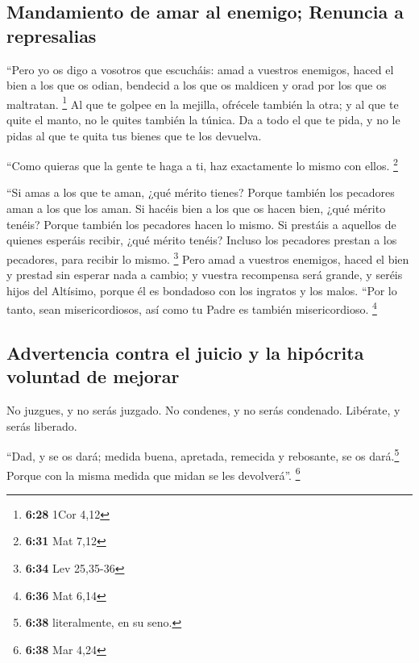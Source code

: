 \begin{paracol}{2}
\hypertarget{mandamiento-de-amar-al-enemigo-renuncia-a-represalias}{%
\subsection{Mandamiento de amar al enemigo; Renuncia a
represalias}\label{mandamiento-de-amar-al-enemigo-renuncia-a-represalias}}

 ``Pero yo os digo a vosotros que escucháis: amad a
vuestros enemigos, haced el bien a los que os odian, 
bendecid a los que os maldicen y orad por los que os maltratan.
\footnote{\textbf{6:28} 1Cor 4,12}  Al que te golpee en
la mejilla, ofrécele también la otra; y al que te quite el manto, no le
quites también la túnica.  Da a todo el que te pida, y no
le pidas al que te quita tus bienes que te los devuelva.

 ``Como quieras que la gente te haga a ti, haz
exactamente lo mismo con ellos. \footnote{\textbf{6:31} Mat 7,12}

 ``Si amas a los que te aman, ¿qué mérito tienes? Porque
también los pecadores aman a los que los aman.  Si hacéis
bien a los que os hacen bien, ¿qué mérito tenéis? Porque también los
pecadores hacen lo mismo.  Si prestáis a aquellos de
quienes esperáis recibir, ¿qué mérito tenéis? Incluso los pecadores
prestan a los pecadores, para recibir lo mismo. \footnote{\textbf{6:34}
  Lev 25,35-36}  Pero amad a vuestros enemigos, haced el
bien y prestad sin esperar nada a cambio; y vuestra recompensa será
grande, y seréis hijos del Altísimo, porque él es bondadoso con los
ingratos y los malos.  ``Por lo tanto, sean
misericordiosos, así como tu Padre es también misericordioso.
\footnote{\textbf{6:36} Mat 6,14}

\hypertarget{advertencia-contra-el-juicio-y-la-hipuxf3crita-voluntad-de-mejorar}{%
\subsection{Advertencia contra el juicio y la hipócrita voluntad de
mejorar}\label{advertencia-contra-el-juicio-y-la-hipuxf3crita-voluntad-de-mejorar}}

 No juzgues, y no serás juzgado. No condenes, y no serás
condenado. Libérate, y serás liberado.

 ``Dad, y se os dará; medida buena, apretada, remecida y
rebosante, se os dará.\footnote{\textbf{6:38} literalmente, en su seno.}
Porque con la misma medida que midan se les devolverá''. \footnote{\textbf{6:38}
  Mar 4,24}


\end{paracol}
